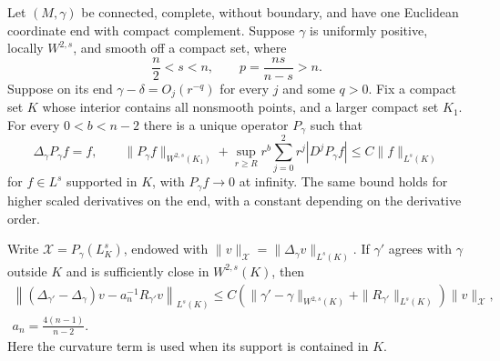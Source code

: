 \begin{lemma}
\label{uniq:compact-inverse}
Let $(M,\gamma)$ be connected, complete, without boundary, and have
one Euclidean coordinate end with compact complement. Suppose
$\gamma$ is uniformly positive, locally $W^{2,s}$, and smooth off
a compact set, where
\[
 \frac n2<s<n,\qquad p=\frac{ns}{n-s}>n.
\]
Suppose on its end $\gamma-\delta=O_j(r^{-q})$ for every $j$
and some $q>0$. Fix a compact set $K$ whose interior contains all
nonsmooth points, and a larger compact set $K_1$. For every
$0<b<n-2$ there is a unique operator $P_\gamma$ such that
\begin{equation}\label{uniq:inverse-estimate}
 \Delta_\gamma P_\gamma f=f,\qquad
 \|P_\gamma f\|_{W^{2,s}(K_1)}
  +\sup_{r\geq R} r^b
       \sum_{j=0}^2 r^j|D^jP_\gamma f|
       \leq C\|f\|_{L^s(K)}
\end{equation}
for $f\in L^s$ supported in $K$, with $P_\gamma f\to0$ at
infinity. The same bound holds for higher scaled derivatives on
the end, with a constant depending on the derivative order.

Write $\mathcal X=P_\gamma(L^s_K)$, endowed with
$\|v\|_{\mathcal X}=\|\Delta_\gamma v\|_{L^s(K)}$.
If $\gamma'$ agrees with $\gamma$ outside $K$ and is sufficiently
close in $W^{2,s}(K)$, then
\begin{equation}\label{uniq:operator-norm}
\begin{gathered}
 \left\| (\Delta_{\gamma'}-\Delta_\gamma)v
                 -a_n^{-1}R_{\gamma'}v\right\|_{L^s(K)}
 \leq C\left(\|\gamma'-\gamma\|_{W^{2,s}(K)}
                       +\|R_{\gamma'}\|_{L^s(K)}\right)
                     \|v\|_{\mathcal X},
 \\ a_n=\frac{4(n-1)}{n-2}.
\end{gathered}
\end{equation}
Here the curvature term is used when its support is contained in $K$.
\end{lemma}

